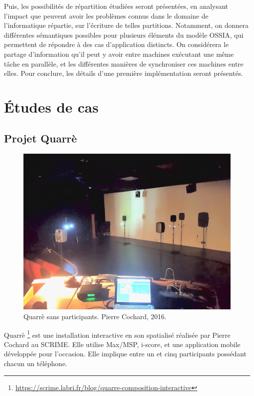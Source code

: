 \documentclass[10pt]{article}
\newcommand\ossia{OSSIA\xspace}
\begin{document}
Puis, les possibilités de répartition étudiées seront présentées, en analysant l'impact que peuvent avoir les problèmes connus dans le domaine de l'informatique répartie, sur l'écriture de telles partitions. 
Notamment, on donnera différentes sémantiques possibles pour plusieurs éléments du modèle \ossia, qui permettent de répondre à des cas d'application distincts. 
On considérera le partage d'information qu'il peut y avoir entre machines exécutant une même tâche en parallèle, et les différentes manières de synchroniser ces machines entre elles.
Pour conclure, les détails d'une première implémentation seront présentés.

\section{Études de cas}

\subsection{Projet Quarrè}

\begin{figure}[h]
    \centering
    \includegraphics[scale=0.2]{images/quarre.jpg}
    \caption[Quarrè]{Quarrè sans participants. Pierre Cochard, 2016.}
    \label{img.quarre}
\end{figure}

Quarrè
\footnote{\tiny\url{https://scrime.labri.fr/blog/quarre-composition-interactive}} est une installation interactive en son spatialisé réalisée par Pierre Cochard au SCRIME. 
Elle utilise Max/MSP, i-score, et une application mobile développée pour l'occasion. 
Elle implique entre un et cinq participants possédant chacun un téléphone.
\end{document}
